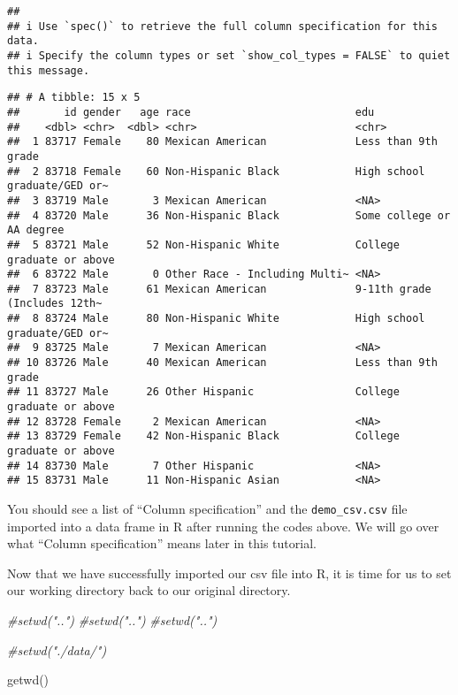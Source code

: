 \documentclass[
]{book}
\newenvironment{Shaded}{\begin{snugshade}}{\end{snugshade}}
\newcommand{\CommentTok}[1]{\textcolor[rgb]{0.56,0.35,0.01}{\textit{#1}}}
\newcommand{\FunctionTok}[1]{\textcolor[rgb]{0.00,0.00,0.00}{#1}}
\newcommand{\NormalTok}[1]{#1}
\begin{document}
\begin{verbatim}
##
## i Use `spec()` to retrieve the full column specification for this data.
## i Specify the column types or set `show_col_types = FALSE` to quiet this message.
\end{verbatim}

\begin{verbatim}
## # A tibble: 15 x 5
##       id gender   age race                          edu
##    <dbl> <chr>  <dbl> <chr>                         <chr>
##  1 83717 Female    80 Mexican American              Less than 9th grade
##  2 83718 Female    60 Non-Hispanic Black            High school graduate/GED or~
##  3 83719 Male       3 Mexican American              <NA>
##  4 83720 Male      36 Non-Hispanic Black            Some college or AA degree
##  5 83721 Male      52 Non-Hispanic White            College graduate or above
##  6 83722 Male       0 Other Race - Including Multi~ <NA>
##  7 83723 Male      61 Mexican American              9-11th grade (Includes 12th~
##  8 83724 Male      80 Non-Hispanic White            High school graduate/GED or~
##  9 83725 Male       7 Mexican American              <NA>
## 10 83726 Male      40 Mexican American              Less than 9th grade
## 11 83727 Male      26 Other Hispanic                College graduate or above
## 12 83728 Female     2 Mexican American              <NA>
## 13 83729 Female    42 Non-Hispanic Black            College graduate or above
## 14 83730 Male       7 Other Hispanic                <NA>
## 15 83731 Male      11 Non-Hispanic Asian            <NA>
\end{verbatim}

You should see a list of ``Column specification'' and the \texttt{demo\_csv.csv} file imported into a data frame in R after running the codes above. We will go over what ``Column specification'' means later in this tutorial.

Now that we have successfully imported our csv file into R, it is time for us to set our working directory back to our original directory.

\begin{Shaded}
\begin{Highlighting}[]
\CommentTok{\#setwd("..")}
\CommentTok{\#setwd("..") }
\CommentTok{\#setwd("..")}


\CommentTok{\#setwd("./data/")}
\end{Highlighting}
\end{Shaded}

\begin{Shaded}
\begin{Highlighting}[]
\FunctionTok{getwd}\NormalTok{()}
\end{Highlighting}
\end{Shaded}
\end{document}
